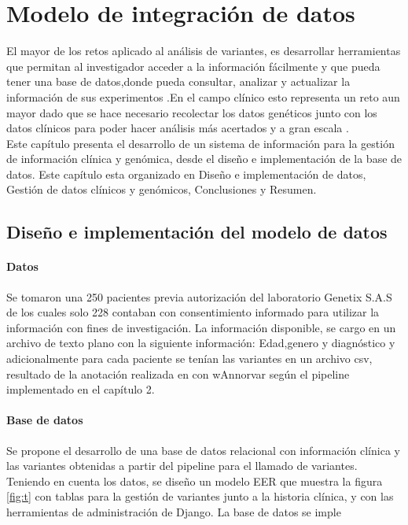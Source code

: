 \chapter{Modelo de integración de datos}

El mayor de los retos aplicado al análisis de variantes, es desarrollar herramientas que permitan al investigador acceder a la información fácilmente y que pueda tener una base de datos,donde pueda consultar, analizar y actualizar la información de sus experimentos \cite{Li2014}.En el campo clínico esto representa un reto aun mayor dado que se hace necesario recolectar los datos genéticos junto con los datos clínicos para poder hacer análisis más acertados y a gran escala \cite{Paila2013}.\\


Este capítulo presenta el desarrollo de un sistema de información para la gestión de información clínica y genómica, desde el diseño e implementación de la base de datos. Este capítulo esta  organizado en Diseño e implementación de datos, Gestión de datos clínicos y genómicos, Conclusiones y  Resumen.

\section{Diseño e implementación del modelo de datos}

\subsubsection{Datos}

Se tomaron una  250 pacientes previa autorización  del laboratorio Genetix S.A.S de los cuales solo 228 contaban con consentimiento informado para utilizar la información con fines de investigación.  La información disponible, se cargo en un archivo de texto plano con la siguiente información: Edad,genero y diagnóstico y adicionalmente para cada paciente se tenían las variantes en un archivo csv, resultado de la anotación realizada en con wAnnorvar según el pipeline implementado en el capítulo 2.\\

\subsubsection{Base de datos}

Se propone el desarrollo de una base de datos relacional con información clínica  y las variantes obtenidas a partir del pipeline para el llamado de variantes. Teniendo en cuenta los datos, se diseño un modelo EER que muestra la figura \ref{fig:t} con tablas para la gestión de variantes junto a la historia clínica, y con las herramientas de administración de Django.  La base de datos se imple

